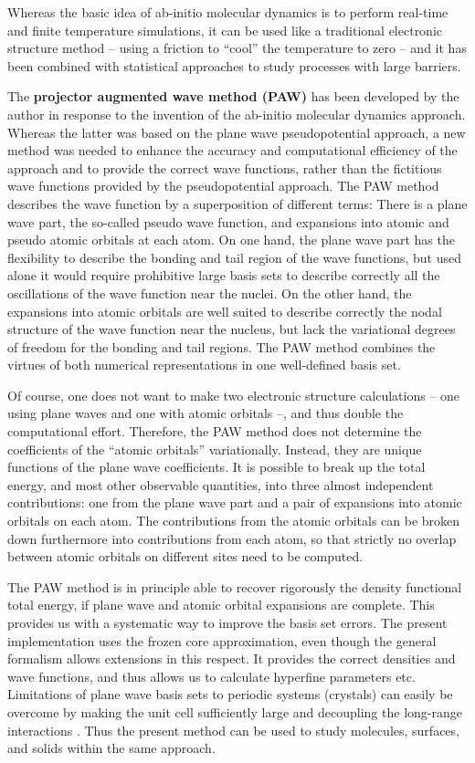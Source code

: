 \documentclass[final,12pt]{article}
\begin{document}
Whereas the basic idea of ab-initio molecular dynamics is to perform
real-time and finite temperature simulations, it can be used like a
traditional electronic structure method -- using a friction to
``cool'' the temperature to zero -- and it has been combined
with statistical approaches to study processes with large barriers.

The {\bf projector augmented wave method (PAW)} \cite{bloechl94_prb50_17953} has been
developed by the author in response to the invention of the ab-initio
molecular dynamics approach. Whereas the latter was based on the plane
wave pseudopotential approach, a new method was needed to enhance the
accuracy and computational efficiency of the approach and to provide
the correct wave functions, rather than the fictitious wave functions
provided by the pseudopotential approach.  The PAW method describes
the wave function by a superposition of different terms: There is a
plane wave part, the so-called pseudo wave function, and expansions
into atomic and pseudo atomic orbitals at each atom. On one hand, the
plane wave part has the flexibility to describe the bonding and tail
region of the wave functions, but used alone it would require
prohibitive large basis sets to describe correctly all the
oscillations of the wave function near the nuclei. On the other hand,
the expansions into atomic orbitals are well suited to describe
correctly the
nodal structure of the wave function near the nucleus, but
lack the variational degrees of freedom for the bonding and tail
regions.  The PAW method combines the virtues of both numerical
representations in one well-defined basis set.

Of course, one does not want to make two electronic structure
calculations  -- one using plane waves and one with atomic
orbitals --, and thus double the computational effort. Therefore, the
PAW method does not determine the coefficients of the ``atomic orbitals''
variationally. Instead, they are unique functions of the plane wave
coefficients. It is possible to break up the total energy, and most
other observable quantities, into three almost independent
contributions: one from the plane wave part and a pair of expansions
into atomic orbitals on each atom. The contributions from the atomic
orbitals can be broken down furthermore into contributions from each atom,
so that strictly no overlap between atomic orbitals on different sites
need to be computed.

The PAW method is in principle able to recover rigorously the density
functional total energy, if plane wave and atomic orbital expansions are
complete. This provides us with a systematic way to improve the basis set
errors.  The present implementation uses the frozen core approximation, even
though the general formalism allows extensions in this respect. It provides
the correct densities and wave functions, and thus allows us to calculate
hyperfine parameters etc.  Limitations of plane wave basis sets to periodic
systems (crystals) can easily be overcome by making the unit cell sufficiently
large and decoupling the long-range interactions
\cite{bloechl95_jcp103_7422}. Thus the present method can be used to study
molecules, surfaces, and solids within the same approach.
\end{document}
